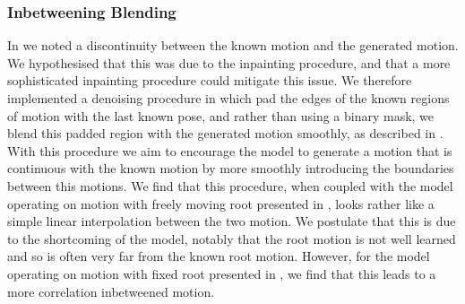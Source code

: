 \subsubsection{Inbetweening Blending}
\label{sec:diffusion_inbetweening_blending}

In  we noted a discontinuity between the known motion and the generated motion. We hypothesised that this was due to the inpainting procedure, and that a more sophisticated inpainting procedure could mitigate this issue. We therefore implemented a denoising procedure in which pad the edges of the known regions of motion with the last known pose, and rather than using a binary mask, we blend this padded region with the generated motion smoothly, as described in . With this procedure we aim to encourage the model to generate a motion that is continuous with the known motion by more smoothly introducing the boundaries between this motions. We find that this procedure, when coupled with the model operating on motion with freely moving root presented in , looks rather like a simple linear interpolation between the two motion. We postulate that this is due to the shortcoming of the model, notably that the root motion is not well learned and so is often very far from the known root motion. However, for the model operating on motion with fixed root presented in , we find that this leads to a more correlation inbetweened motion.

